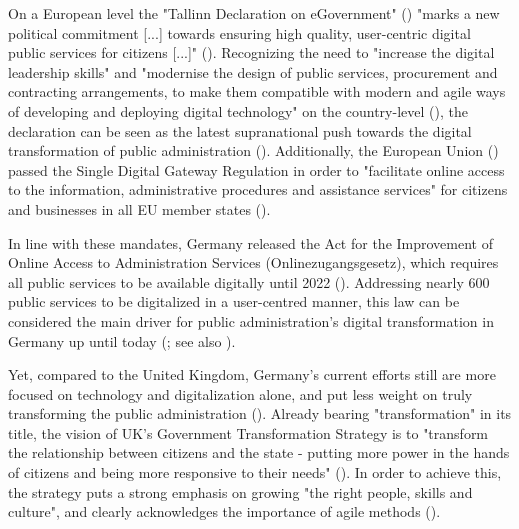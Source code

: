 On a European level the "Tallinn Declaration on eGovernment" (\cite*{EuropeanCommission2017}) "marks a new political commitment [...] towards ensuring high quality, user-centric digital public services for citizens [...]" (\cite{EuropeanCommission2017a}). Recognizing the need to "increase the digital leadership skills" and "modernise the design of public services, procurement and contracting arrangements, to make them compatible with modern and agile ways of developing and deploying digital technology" on the country-level (\cite[p. 7]{EuropeanCommission2017}), the declaration can be seen as the latest supranational push towards the digital transformation of public administration (\cite{Mergel2019a}). Additionally, the European Union (\cite*{EuropeanUnion2018}) passed the Single Digital Gateway Regulation in order to "facilitate online access to the information, administrative procedures and assistance services" for citizens and businesses in all EU member states (\cite{EuropeanCommission2018a}).\par 
In line with these mandates, Germany released the Act for the Improvement of Online Access to Administration Services (Onlinezugangsgesetz), which requires all public services to be available digitally until 2022 (\cite{DeutscherBundestag2017}). Addressing nearly 600 public services to be digitalized in a user-centred manner, this law can be considered the main driver for public administration's digital transformation in Germany up until today (\cite{Mergel2019, BundesministeriumdesInnerenfurBauundHeimat2017}; see also \cite{EuropeanCommission2019a}).\par 
Yet, compared to the United Kingdom, Germany's current efforts still are more focused on technology and digitalization alone, and put less weight on truly transforming the public administration (\cite{Mergel2019, EuropeanCommission2019b}). Already bearing "transformation" in its title, the vision of UK's Government Transformation Strategy is to "transform the relationship between citizens and the state - putting more power in the hands of citizens and being more responsive to their needs" (\cite{CabinetOffice2017}). In order to achieve this, the strategy puts a strong emphasis on growing "the right people, skills and culture", and clearly acknowledges the importance of agile methods (\cite{CabinetOffice2017}).\par 


